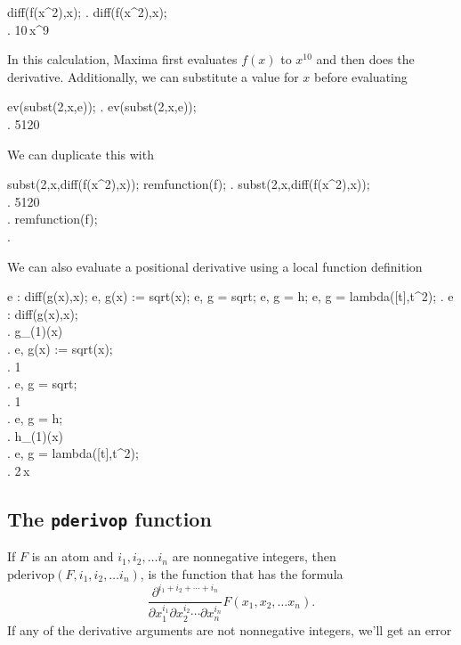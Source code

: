 {{\beginmaximasession
diff(f(x^2),x);
\maximatexsession
{}.  diff(f(x^2),x); \\
.  10\,x^9 \\
\endmaximasession

\noindent In this calculation, Maxima first evaluates $f(x)$ to $x^{10}$ and then does the derivative.  Additionally, we can substitute a value for $x$ 
before evaluating

\beginmaximasession
ev(subst(2,x,e));
\maximatexsession
{}.  ev(subst(2,x,e)); \\
.  5120 \\
\endmaximasession

\noindent We can duplicate this with

\beginmaximasession
subst(2,x,diff(f(x^2),x));
remfunction(f);
\maximatexsession
{}.  subst(2,x,diff(f(x^2),x)); \\
.  5120 \\
.  remfunction(f); \\
.  \left[ f \right] \\
\endmaximasession

\noindent We can also evaluate a positional derivative using a local 
function definition

\beginmaximasession
e : diff(g(x),x);
e, g(x) := sqrt(x);
e, g = sqrt; 
e, g = h; 
e, g = lambda([t],t^2);
\maximatexsession
{}.  e : diff(g(x),x); \\
.  g_{\left(1\right)}(x) \\
.  e, g(x) := sqrt(x); \\
.  {{1}} \\
.  e, g = sqrt; \\
.  {{1}} \\
.  e, g = h; \\
.  h_{\left(1\right)}(x) \\
.  e, g = lambda([t],t^2); \\
.  2\,x \\
\endmaximasession

\subsection*{The {\tt pderivop} function}

If $F$ is an atom and $i_1, i_2, \dots i_n$ are nonnegative
integers, then $ \mbox{pderivop}(F,i_1,i_2, \dots i_n)$, is the 
function that has the formula 
\[
   \frac{\partial^{i_1 + i_2 + \cdots + i_n}}{\partial x_1^{i_1} 
     \partial x_2^{i_2}  \cdots \partial x_n^{i_n}} F(x_1,x_2, \dots x_n). 
\]
If any of the derivative arguments are not nonnegative integers,
we'll get an error

}}
